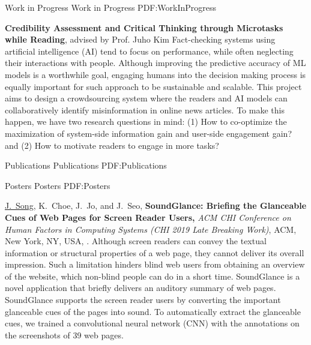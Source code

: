 \documentclass[letterpaper,MMMyyyy,nonstopmode]{template}
\begin{document}
\begin{Body}
\endgroup

\newpage

\BigGap
\SubSection
{Work in Progress}
{Work in Progress}
{PDF:WorkInProgress}

\begingroup
\renewcommand{\MaxNumberedItem}{[88]}

\BigGap
\NumberedItem{[3]}
  \textbf{Credibility Assessment and Critical Thinking through Microtasks while Reading}, advised by Prof. Juho Kim
  \vspace{2mm}\newline
  {\small{
    Fact-checking systems using artificial intelligence (AI) tend to focus on performance, while often neglecting their interactions with people. Although improving the predictive accuracy of ML models is a worthwhile goal, engaging humans into the decision making process is equally important for such approach to be sustainable and scalable. This project aims to design a crowdsourcing system where the readers and AI models can collaboratively identify misinformation in online news articles. To make this happen, we have two research questions in mind: (1) How to co-optimize the maximization of system-side information gain and user-side engagement gain? and (2) How to motivate readers to engage in more tasks? 
  }}

\endgroup



\BigGap
\Section
{Publications}
{Publications}
{PDF:Publications}

\SubSection
{Posters}
{Posters}
{PDF:Posters}

\begingroup
\renewcommand{\MaxNumberedItem}{[88]}

\BigGap
\NumberedItem{[4]}
  \href{https://doi.org/10.1145/3290607.3312865}
  \underline{J.~Song}, K.~Choe, J.~Jo, and J.~Seo,
  \textbf{SoundGlance: Briefing the Glanceable Cues of Web Pages for Screen Reader Users,}
  \textit{ACM CHI Conference on Human Factors in Computing Systems (CHI 2019 Late Breaking Work)},
  ACM, New York, NY, USA,
  .
  \vspace{2mm}\newline
  {\small{
    Although screen readers can convey the textual information or structural properties of a web page, they cannot deliver its overall impression. Such a limitation hinders blind web users from obtaining an overview of the website, which non-blind people can do in a short time. 
    SoundGlance is a novel application that briefly delivers an auditory summary of web pages. SoundGlance supports the screen reader users by converting the important glanceable cues of the pages into sound.
    To automatically extract the glanceable cues, we trained a convolutional neural network (CNN) with the annotations on the screenshots of 39 web pages.
  }}


\end{Body}
\end{document}
